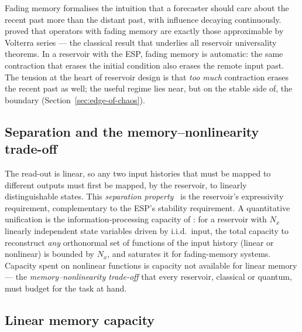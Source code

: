 Fading memory formalises the intuition that a forecaster should care about the
recent past more than the distant past, with influence decaying continuously.
\citet{boyd1985fading} proved that operators with fading memory are exactly
those approximable by Volterra series --- the classical result that underlies all
reservoir universality theorems. In a reservoir with the ESP, fading memory is
automatic: the same contraction that erases the initial condition also erases
the remote input past. The tension at the heart of reservoir design is that
\emph{too much} contraction erases the recent past as well; the useful regime
lies near, but on the stable side of, the boundary
(Section~\ref{sec:edge-of-chaos}).

\subsection{Separation and the memory--nonlinearity trade-off}

The read-out is linear, so any two input histories that must be mapped to
different outputs must first be mapped, by the reservoir, to linearly
distinguishable states. This \emph{separation property}~\citep{maass2002realtime}
is the reservoir's expressivity requirement, complementary to the ESP's
stability requirement. A quantitative unification is the information-processing
capacity of \citet{dambre2012information}: for a reservoir with $N_x$
linearly independent state variables driven by i.i.d.\ input, the total
capacity to reconstruct \emph{any} orthonormal set of functions of the input
history (linear or nonlinear) is bounded by $N_x$, and saturates it for
fading-memory systems. Capacity spent on nonlinear functions is capacity not
available for linear memory --- the \emph{memory--nonlinearity trade-off} that
every reservoir, classical or quantum, must budget for the task at hand.

\subsection{Linear memory capacity}
\label{sec:memory-capacity}

